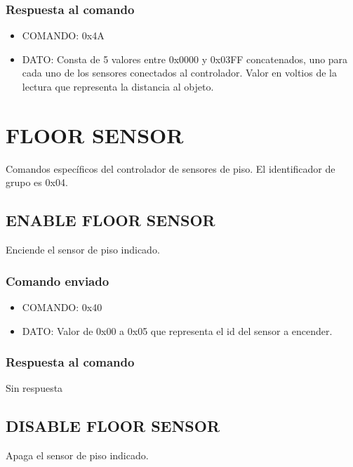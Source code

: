 \documentclass[a4paper,10pt]{article}
\begin{document}
\subsubsection*{Respuesta al comando}

\begin{itemize}
	\item{COMANDO:} 0x4A
	\item{DATO:} Consta de 5 valores entre 0x0000 y 0x03FF concatenados, uno para cada uno de los sensores conectados al controlador.
	Valor en voltios de la lectura que representa la distancia al objeto.
\end{itemize}

\section{FLOOR SENSOR} 
\label{grupo_floor_sensor}

Comandos espec\'ificos del controlador de sensores de piso.
El identificador de grupo es 0x04.

\subsection{ENABLE FLOOR SENSOR}
\label{enable_fs}

Enciende el sensor de piso indicado.

\subsubsection*{Comando enviado}

\begin{itemize}
	\item{COMANDO:} 0x40
	\item{DATO:} Valor de 0x00 a 0x05 que representa el id del sensor a encender.
\end{itemize}

\subsubsection*{Respuesta al comando}

Sin respuesta

\subsection{DISABLE FLOOR SENSOR}
\label{disable_fs}

Apaga el sensor de piso indicado.
\end{document}
